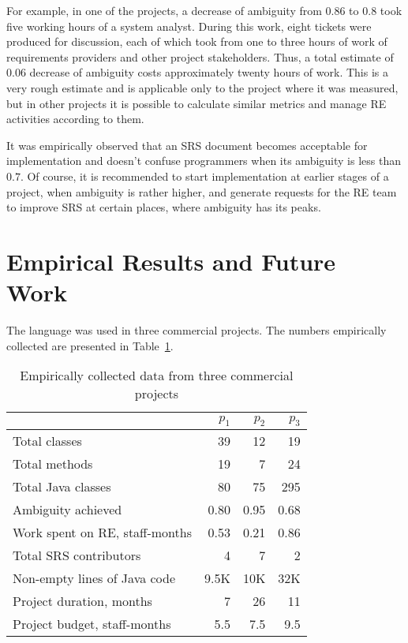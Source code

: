 \documentclass[conference]{IEEEtran}
\begin{document}
For example, in one of the projects, a decrease of ambiguity from $0.86$ to
$0.8$ took five working hours of a system analyst. During this work, eight
tickets were produced for discussion, each of which took from one to three
hours of work of requirements providers and other project stakeholders.
Thus, a total estimate of 0.06 decrease of ambiguity costs approximately
twenty hours of work. This is a very rough estimate and is applicable only
to the project where it was measured, but in other projects it is possible
to calculate similar metrics and manage RE activities according to them.

It was empirically observed that an SRS document becomes acceptable for
implementation and doesn't confuse programmers when its ambiguity is less
than $0.7$. Of course, it is recommended to start implementation at earlier
stages of a project, when ambiguity is rather higher, and generate requests
for the RE team to improve SRS at certain places, where ambiguity has
its peaks.

\section{Empirical Results and Future Work}
\label{sec:results}

The language was used in three commercial projects. The numbers
empirically collected are presented in Table~\ref{table:numbers}.

\begin{table}
\begin{tabular}{>{\raggedright}p{14em}rrr}
                                            & $p_1$ & $p_2$ & $p_3$ \\
\hline
Total classes                                 & 39 & 12 & 19 \\
Total methods                                 & 19 & 7 & 24 \\
Total Java classes                                  & 80 & 75 & 295 \\
\rowcolor{lightgray!50}
Ambiguity achieved                                  & 0.80 & 0.95 & 0.68 \\
Work spent on RE, staff-months                      & 0.53 & 0.21 & 0.86 \\
Total SRS contributors                              & 4 & 7 & 2 \\
Non-empty lines of Java code                        & 9.5K & 10K & 32K \\
Project duration, months                            & 7 & 26 & 11 \\
Project budget, staff-months                        & 5.5 & 7.5 & 9.5 \\
\hline
\end{tabular}
\caption{Empirically collected data from three commercial projects}
\label{table:numbers}
\end{table}
\end{document}
